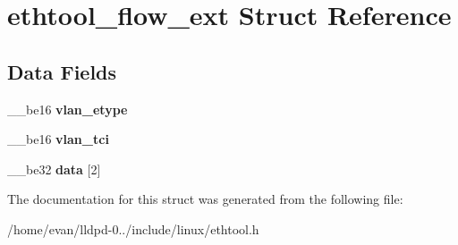\section{ethtool\-\_\-flow\-\_\-ext \-Struct \-Reference}
\label{structethtool__flow__ext}
\subsection*{\-Data \-Fields}
\begin{DoxyCompactItemize}
\item 
\-\_\-\-\_\-be16 {\bfseries vlan\-\_\-etype}\label{structethtool__flow__ext_a2874c0bd48aa0846f369c7f93843d3f8}

\item 
\-\_\-\-\_\-be16 {\bfseries vlan\-\_\-tci}\label{structethtool__flow__ext_aabf2c0d5a1835e5771ddcca31c058be8}

\item 
\-\_\-\-\_\-be32 {\bfseries data} [2]\label{structethtool__flow__ext_a1087fefa0d7910cae29dadfd28877d28}

\end{DoxyCompactItemize}


\-The documentation for this struct was generated from the following file\-:\begin{DoxyCompactItemize}
\item 
/home/evan/lldpd-\/0../include/linux/ethtool.\-h\end{DoxyCompactItemize}
